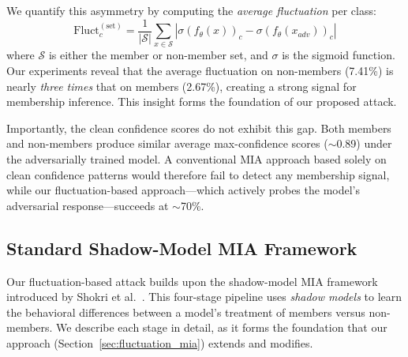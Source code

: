 \documentclass[conference]{IEEEtran}
\begin{document}
We quantify this asymmetry by computing the \textit{average fluctuation} per class:
\begin{equation}
    \text{Fluct}_{c}^{(\text{set})} = \frac{1}{|\mathcal{S}|} \sum_{x \in \mathcal{S}} \left| \sigma(f_\theta(x))_c - \sigma(f_\theta(x_{adv}))_c \right|
    \label{eq:fluctuation_def}
\end{equation}
where $\mathcal{S}$ is either the member or non-member set, and $\sigma$ is the sigmoid function. Our experiments reveal that the average fluctuation on non-members (7.41\%) is nearly \textit{three times} that on members (2.67\%), creating a strong signal for membership inference. This insight forms the foundation of our proposed attack.

Importantly, the clean confidence scores do not exhibit this gap. Both members and non-members produce similar average max-confidence scores ($\sim$0.89) under the adversarially trained model. A conventional MIA approach based solely on clean confidence patterns would therefore fail to detect any membership signal, while our fluctuation-based approach---which actively probes the model's adversarial response---succeeds at $\sim$70\%.


\subsection{Standard Shadow-Model MIA Framework}
\label{sec:standard_mia}

Our fluctuation-based attack builds upon the shadow-model MIA framework introduced by Shokri et al.~\cite{shokri2017membership}. This four-stage pipeline uses \textit{shadow models} to learn the behavioral differences between a model's treatment of members versus non-members. We describe each stage in detail, as it forms the foundation that our approach (Section~\ref{sec:fluctuation_mia}) extends and modifies.
\end{document}
